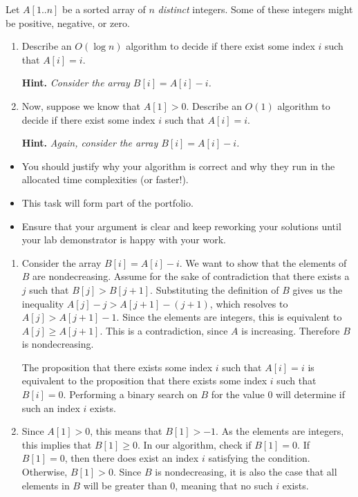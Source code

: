 \documentclass{article}
\begin{document}
\begin{question}
Let $A[1..n]$ be a sorted array of $n$ {\em distinct} integers. Some of these integers might be positive, negative, or zero.
\begin{enumerate}[label = (\alph*)]
    \item Describe an $O(\log n)$ algorithm to decide if there exist some index $i$ such that $A[i] = i$.

    {\bfseries Hint.} {\em Consider the array $B[i] = A[i] - i$.}

    \item Now, suppose we know that $A[1] > 0$. Describe an $O(1)$ algorithm to decide if there exist some index $i$ such that $A[i] = i$.

    {\bfseries Hint.} {\em Again, consider the array $B[i] = A[i] - i$.}
\end{enumerate}
\end{question}

\begin{rubric}
\begin{itemize}
    \item You should justify why your algorithm is correct and why they run in the allocated time complexities (or faster!).

    \item This task will form part of the portfolio.
    \item Ensure that your argument is clear and keep reworking your solutions until your lab demonstrator is happy with your work.
\end{itemize}
\end{rubric}

\begin{solution}
\begin{enumerate}[label = (\alph*)]
    \item Consider the array $B[i]=A[i]-i$. We want to show that the elements of $B$ are nondecreasing.
    Assume for the sake of contradiction that there exists a $j$ such that $B[j] > B[j + 1]$.
    Substituting the definition of $B$ gives us the inequality $A[j]-j > A[j+1]-(j+1)$, which resolves to 
    $A[j]>A[j+1]-1$. Since the elements are integers, this is equivalent to $A[j]\geq A[j+1]$.
    This is a contradiction, since $A$ is increasing. Therefore $B$ is nondecreasing.

    The proposition that there exists some index $i$ such that $A[i]=i$ is equivalent to the proposition that 
    there exists some index $i$ such that $B[i] = 0$. Performing a binary search on $B$ for the value $0$ will determine if such an index $i$ exists.

    \item Since $A[1]>0$, this means that $B[1]>-1$. As the elements are integers, this implies that $B[1]\geq 0$. 
    In our algorithm, check if $B[1] = 0$. If $B[1] = 0$, then there does exist an index $i$ satisfying the condition.
    Otherwise, $B[1] > 0$. Since $B$ is nondecreasing, it is also the case that all elements in $B$ will be greater than $0$, meaning that no such $i$ exists.

\end{enumerate}
\end{solution}
\end{document}
